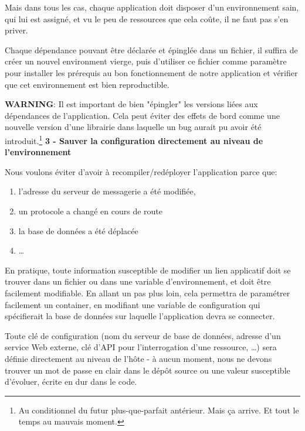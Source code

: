 \documentclass[11pt]{amsbook}
\newcommand{\admonition}[2]{\textbf{#1}: {#2}}
\begin{document}
Mais dans tous les cas, chaque application doit disposer d’un environnement sain, qui lui est assigné, et vu le peu de ressources que cela coûte, il ne faut pas s’en priver.


Chaque dépendance pouvant être déclarée et épinglée dans un fichier, il suffira de créer un nouvel environment vierge, puis d’utiliser ce fichier comme paramètre pour installer les prérequis au bon fonctionnement de notre application et vérifier que cet environnement est bien reproductible.


\admonition{WARNING}{Il est important de bien "épingler" les versions liées aux dépendances de l’application. Cela peut éviter des effets de bord comme une nouvelle version d’une librairie dans laquelle un bug aurait pu avoir été introduit.\footnote{Au conditionnel du futur plus-que-parfait antérieur. Mais ça arrive. Et tout le temps au mauvais moment.}}
\textbf{3 - Sauver la configuration directement au niveau de l’environnement}


Nous voulons éviter d’avoir à recompiler/redéployer l’application parce que:


\begin{enumerate}

\item{l’adresse du serveur de messagerie a été modifiée,}

\item{un protocole a changé en cours de route}

\item{la base de données a été déplacée}

\item{…​}

\end{enumerate}


En pratique, toute information susceptible de modifier un lien applicatif doit se trouver dans un fichier ou dans une variable d’environnement, et doit être facilement modifiable.
En allant un pas plus loin, cela permettra de paramétrer facilement un container, en modifiant une variable de configuration qui spécifierait la base de données sur laquelle l’application devra se connecter.


Toute clé de configuration (nom du serveur de base de données, adresse d’un service Web externe, clé d’API pour l’interrogation d’une ressource, …​) sera définie directement au niveau de l’hôte - à aucun moment, nous ne devons trouver un mot de passe en clair dans le dépôt source ou une valeur susceptible d’évoluer, écrite en dur dans le code.
\end{document}
